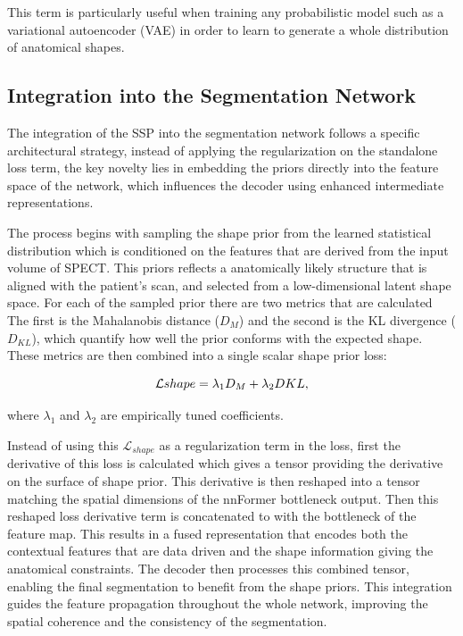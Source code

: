 This term is particularly useful when training any probabilistic model such as a variational autoencoder (VAE) in order to learn to generate a whole distribution of anatomical shapes.

\subsection{Integration into the Segmentation Network}
The integration of the SSP into the segmentation network follows a specific architectural strategy, instead of applying the regularization on the standalone loss term, the key novelty lies in embedding the priors directly into the feature space of the network, which influences the decoder using enhanced intermediate representations. 

The process begins with sampling the shape prior from the learned statistical distribution which is conditioned on the features that are derived from the input volume of SPECT. This priors reflects a anatomically likely structure that is aligned with the patient's scan, and selected from a low-dimensional latent shape space. For each of the sampled prior there are two metrics that are calculated The first is the Mahalanobis distance ($D_M$) and the second is the KL divergence ($D_{KL}$), which quantify how well the prior conforms with the expected shape. These metrics are then combined into a single scalar shape prior loss:

\begin{equation}
\addcontentsline{equ}{equations}{\protect\numberline{\theequation}Combined Shape Loss} 
\mathcal{L}{shape} = \lambda_1 D_M + \lambda_2 D{KL}, 
\end{equation}

where $\lambda_1$ and $\lambda_2$ are empirically tuned coefficients.

Instead of using this $\mathcal{L}_{shape}$ as a regularization term in the loss, first the derivative of this loss is calculated which gives a tensor providing the derivative on the surface of shape prior. This derivative is then reshaped into a tensor matching the spatial dimensions of the nnFormer bottleneck output. Then this reshaped loss derivative term is concatenated to with the bottleneck of the feature map. This results in a fused representation that encodes both the contextual features that are data driven and the shape information giving the anatomical constraints. The decoder then processes this combined tensor, enabling the final segmentation to benefit from the shape priors. This integration guides the feature propagation throughout the whole network, improving the spatial coherence and the consistency of the segmentation.

